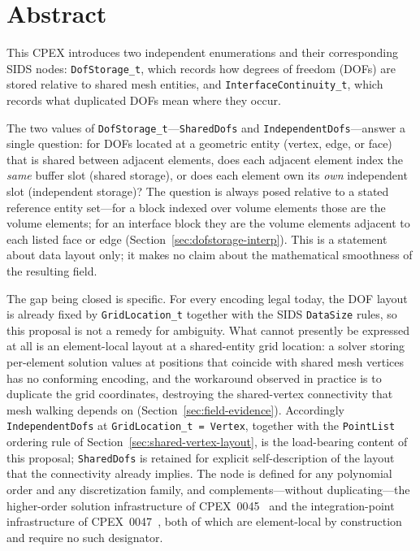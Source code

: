 \documentclass[11pt,letterpaper]{article}
\begin{document}
\vspace{1.5em}

\tableofcontents
\newpage

\section{Abstract}

This CPEX introduces two independent enumerations and their corresponding SIDS nodes:
\texttt{DofStorage\_t}, which records how degrees of freedom (DOFs) are stored relative to
shared mesh entities, and \texttt{InterfaceContinuity\_t}, which records what duplicated DOFs
mean where they occur.

The two values of \texttt{DofStorage\_t}---\texttt{SharedDofs} and
\texttt{IndependentDofs}---answer a single question: for DOFs located at a geometric entity
(vertex, edge, or face) that is shared between adjacent elements, does each adjacent element
index the \emph{same} buffer slot (shared storage), or does each element own its
\emph{own} independent slot (independent storage)?  The question is always posed relative to
a stated reference entity set---for a block indexed over volume elements those are the volume
elements; for an interface block they are the volume elements adjacent to each listed face or
edge (Section~\ref{sec:dofstorage-interp}).  This is a statement about data layout
only; it makes no claim about the mathematical smoothness of the resulting field.

The gap being closed is specific.  For every encoding legal today, the DOF layout is already
fixed by \texttt{GridLocation\_t} together with the SIDS \texttt{DataSize} rules, so this
proposal is not a remedy for ambiguity.  What cannot presently be expressed at all is an
element-local layout at a shared-entity grid location: a solver storing per-element solution
values at positions that coincide with shared mesh vertices has no conforming encoding, and
the workaround observed in practice is to duplicate the grid coordinates, destroying the
shared-vertex connectivity that mesh walking depends on (Section~\ref{sec:field-evidence}).
Accordingly \texttt{IndependentDofs} at \texttt{GridLocation\_t = Vertex}, together with the
\texttt{PointList} ordering rule of Section~\ref{sec:shared-vertex-layout}, is the
load-bearing content of this proposal; \texttt{SharedDofs} is retained for explicit
self-description of the layout that the connectivity already implies.  The node is defined
for any polynomial order and any discretization family, and complements---without
duplicating---the higher-order solution infrastructure of CPEX~0045~\cite{cpex0045} and the
integration-point infrastructure of CPEX~0047~\cite{cpex0047}, both of which are
element-local by construction and require no such designator.
\end{document}
